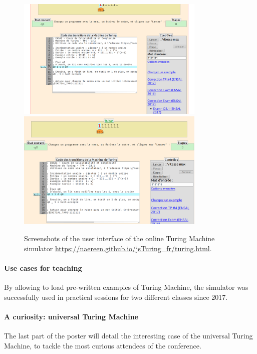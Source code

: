 \documentclass[runningheads]{llncs}
\begin{document}
\begin{figure}[!h]
    \centering
    \includegraphics[width=9cm]{interactive_Turing_Machine_simulator_1.png}
    \includegraphics[width=9cm]{interactive_Turing_Machine_simulator_2.png}
    \caption{Screenshots of the user interface of the online Turing Machine simulator \url{https://naereen.github.io/jsTuring_fr/turing.html}.}
\end{figure}


\paragraph{Use cases for teaching}

By allowing to load pre-written examples of Turing Machine, the simulator was successfully used in practical sessions for two different classes since 2017.


\paragraph{A curiosity: universal Turing Machine}

The last part of the poster will detail the interesting case of the universal Turing Machine, to tackle the most curious attendees of the conference.
\end{document}
